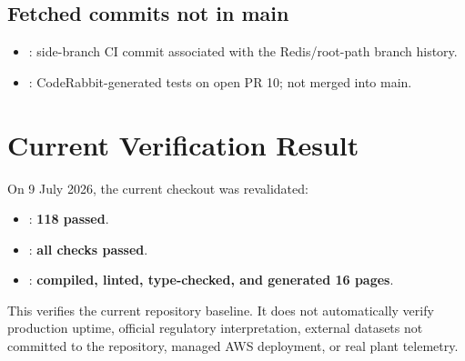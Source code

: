 \documentclass[10pt,a4paper]{article}
\begin{document}
\subsection{Fetched commits not in main}

\begin{itemize}
  \item {}: side-branch CI commit associated with the Redis/root-path branch history.
  \item {}: CodeRabbit-generated tests on open PR 10; not merged into main.
\end{itemize}

\section{Current Verification Result}

On 9 July 2026, the current checkout was revalidated:

\begin{itemize}
  \item {}: \textbf{118 passed}.
  \item {}: \textbf{all checks passed}.
  \item {}: \textbf{compiled, linted, type-checked, and generated 16 pages}.
\end{itemize}

This verifies the current repository baseline. It does not automatically verify production
uptime, official regulatory interpretation, external datasets not committed to the repository,
managed AWS deployment, or real plant telemetry.

\clearpage

\end{document}
